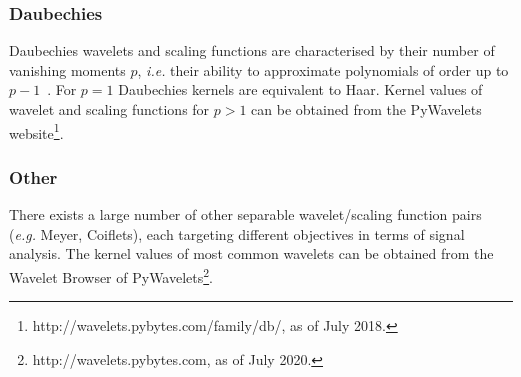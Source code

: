 \documentclass[fleqn,a4paper,oneside,openany]{book}
\renewcommand{\marginnote}[2][]{}
\begin{document}
\subsubsection{Daubechies}\label{sec:daubechies}
%
Daubechies wavelets and scaling functions are characterised by their number of vanishing moments $p$, \textit{i.e.} their ability to approximate polynomials of order up to $p-1$~\cite{Dau1992}.
For $p=1$ Daubechies kernels are equivalent to Haar.
Kernel values of wavelet and scaling functions for $p>1$ can be obtained from the PyWavelets website\footnote{http://wavelets.pybytes.com/family/db/, as of July 2018.}.
%
\subsubsection{Other}\label{sec:otherWavelets}
%
There exists a large number of other separable wavelet/scaling function pairs (\textit{e.g.} Meyer, Coiflets), each targeting different objectives in terms of signal analysis. The kernel values of most common wavelets can be obtained from the Wavelet Browser of PyWavelets\footnote{http://wavelets.pybytes.com, as of July 2020.}.
%
\marginnote{\footnotesize v6: Added implementation troubleshooting to clarify how undecimated wavelet decomposition should be implemented.}
%
\vspace{2mm}
\end{document}
